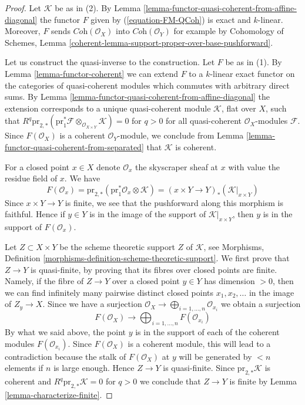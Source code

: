 \documentclass{stacks-project}
\theoremstyle{plain}
\theoremstyle{definition}
\theoremstyle{remark}
\numberwithin{equation}{subsection}
\begin{document}
\begin{proof}
Let $\mathcal{K}$ be as in (2). By
Lemma \ref{lemma-functor-quasi-coherent-from-affine-diagonal}
the functor $F$ given by (\ref{equation-FM-QCoh}) is exact and $k$-linear.
Moreover, $F$ sends $\textit{Coh}(\mathcal{O}_X)$ into
$\textit{Coh}(\mathcal{O}_Y)$ for example by
Cohomology of Schemes, Lemma
\ref{coherent-lemma-support-proper-over-base-pushforward}.

\medskip\noindent
Let us construct the quasi-inverse to the construction. Let $F$ be
as in (1). By Lemma \ref{lemma-functor-coherent} we can extend $F$
to a $k$-linear exact functor on the
categories of quasi-coherent modules which commutes with arbitrary direct sums.
By Lemma \ref{lemma-functor-quasi-coherent-from-affine-diagonal}
the extension corresponds to a unique quasi-coherent module
$\mathcal{K}$, flat over $X$, such that
$R^q\text{pr}_{2, *}(\text{pr}_1^*\mathcal{F}
\otimes_{\mathcal{O}_{X \times Y}} \mathcal{K}) = 0$ for $q > 0$
for all quasi-coherent $\mathcal{O}_X$-modules $\mathcal{F}$.
Since $F(\mathcal{O}_X)$ is a coherent $\mathcal{O}_Y$-module, we
conclude from Lemma \ref{lemma-functor-quasi-coherent-from-separated}
that $\mathcal{K}$ is coherent.

\medskip\noindent
For a closed point $x \in X$ denote $\mathcal{O}_x$ the skyscraper sheaf
at $x$ with value the residue field of $x$. We have
$$
F(\mathcal{O}_x) =
\text{pr}_{2, *}(\text{pr}_1^*\mathcal{O}_x \otimes \mathcal{K}) =
(x \times Y \to Y)_*(\mathcal{K}|_{x \times Y})
$$
Since $x \times Y \to Y$ is finite, we see that the pushforward along
this morphism is faithful. Hence if $y \in Y$ is in the image of the
support of $\mathcal{K}|_{x \times Y}$, then $y$ is in the support of
$F(\mathcal{O}_x)$.

\medskip\noindent
Let $Z \subset X \times Y$ be the scheme theoretic support $Z$ of
$\mathcal{K}$, see
Morphisms, Definition \ref{morphisms-definition-scheme-theoretic-support}.
We first prove that $Z \to Y$ is quasi-finite, by proving that its fibres
over closed points are finite. Namely, if the fibre of $Z \to Y$ over a
closed point $y \in Y$ has dimension $> 0$, then we can find infinitely
many pairwise distinct closed points $x_1, x_2, \ldots$ in the image of
$Z_y \to X$. Since we have a surjection
$\mathcal{O}_X \to \bigoplus_{i = 1, \ldots, n} \mathcal{O}_{x_i}$
we obtain a surjection
$$
F(\mathcal{O}_X) \to \bigoplus\nolimits_{i = 1, \ldots, n} F(\mathcal{O}_{x_i})
$$
By what we said above, the point $y$ is in the support of each
of the coherent modules $F(\mathcal{O}_{x_i})$. Since $F(\mathcal{O}_X)$
is a coherent module, this will lead to a contradiction because
the stalk of $F(\mathcal{O}_X)$ at $y$ will be generated by $< n$ elements
if $n$ is large enough. Hence $Z \to Y$ is quasi-finite.
Since $\text{pr}_{2, *}\mathcal{K}$ is coherent and
$R^q\text{pr}_{2, *}\mathcal{K} = 0$ for $q > 0$ we conclude
that $Z \to Y$ is finite by Lemma \ref{lemma-characterize-finite}.
\end{proof}
\end{document}
